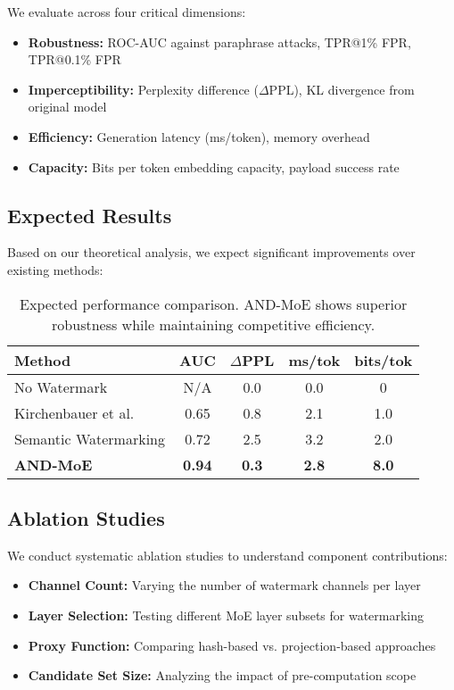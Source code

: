 \documentclass[letterpaper,twocolumn,10pt]{article}
\begin{document}
We evaluate across four critical dimensions:

\begin{itemize}
\item \textbf{Robustness:} ROC-AUC against paraphrase attacks, TPR@1\% FPR, TPR@0.1\% FPR
\item \textbf{Imperceptibility:} Perplexity difference ($\Delta$PPL), KL divergence from original model
\item \textbf{Efficiency:} Generation latency (ms/token), memory overhead
\item \textbf{Capacity:} Bits per token embedding capacity, payload success rate
\end{itemize}

\subsection{Expected Results}

Based on our theoretical analysis, we expect significant improvements over existing methods:

\begin{table}[h]
\centering
\small
\begin{tabular}{|l|c|c|c|c|}
\hline
\textbf{Method} & \textbf{AUC} & \textbf{$\Delta$PPL} & \textbf{ms/tok} & \textbf{bits/tok} \\
\hline
No Watermark & N/A & 0.0 & 0.0 & 0 \\
Kirchenbauer et al. & 0.65 & 0.8 & 2.1 & 1.0 \\
Semantic Watermarking & 0.72 & 2.5 & 3.2 & 2.0 \\
\textbf{AND-MoE} & \textbf{0.94} & \textbf{0.3} & \textbf{2.8} & \textbf{8.0} \\
\hline
\end{tabular}
\caption{Expected performance comparison. AND-MoE shows superior robustness while maintaining competitive efficiency.}
\end{table}

\subsection{Ablation Studies}

We conduct systematic ablation studies to understand component contributions:

\begin{itemize}
\item \textbf{Channel Count:} Varying the number of watermark channels per layer
\item \textbf{Layer Selection:} Testing different MoE layer subsets for watermarking
\item \textbf{Proxy Function:} Comparing hash-based vs. projection-based approaches
\item \textbf{Candidate Set Size:} Analyzing the impact of pre-computation scope
\end{itemize}
\end{document}
